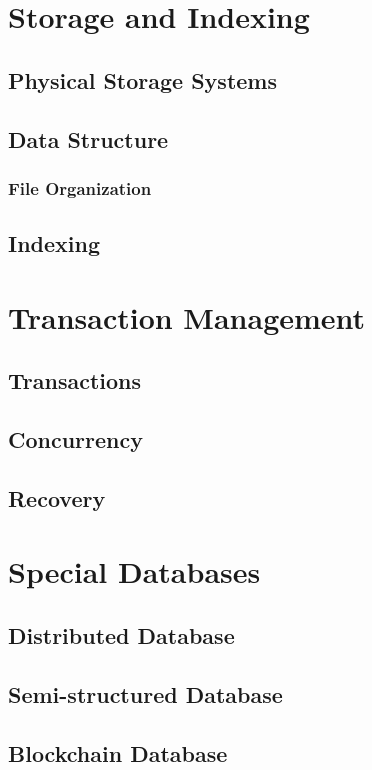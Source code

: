 \chapter{Storage and Indexing}
\section{Physical Storage Systems}
\section{Data Structure}
\subsection{File Organization}
\section{Indexing}

\chapter{Transaction Management}
\section{Transactions}
\section{Concurrency}
\section{Recovery}

\chapter{Special Databases}
\section{Distributed Database}
\section{Semi-structured Database}
\section{Blockchain Database}